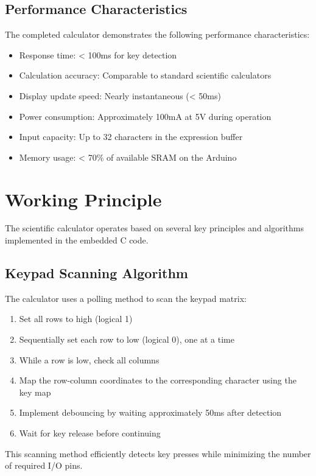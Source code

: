 \documentclass[12pt]{article}
\begin{document}
	\subsection{Performance Characteristics}
	The completed calculator demonstrates the following performance characteristics:
	
	\begin{itemize}
		\item Response time: < 100ms for key detection
		\item Calculation accuracy: Comparable to standard scientific calculators
		\item Display update speed: Nearly instantaneous (< 50ms)
		\item Power consumption: Approximately 100mA at 5V during operation
		\item Input capacity: Up to 32 characters in the expression buffer
		\item Memory usage: < 70\% of available SRAM on the Arduino
	\end{itemize}
	
	\section{Working Principle}
	The scientific calculator operates based on several key principles and algorithms implemented in the embedded C code.
	
	\subsection{Keypad Scanning Algorithm}
	The calculator uses a polling method to scan the keypad matrix:
	
	\begin{enumerate}
		\item Set all rows to high (logical 1)
		\item Sequentially set each row to low (logical 0), one at a time
		\item While a row is low, check all columns
		\item Map the row-column coordinates to the corresponding character using the key map
		\item Implement debouncing by waiting approximately 50ms after detection
		\item Wait for key release before continuing
	\end{enumerate}
	
	This scanning method efficiently detects key presses while minimizing the number of required I/O pins.
	
\end{document}
